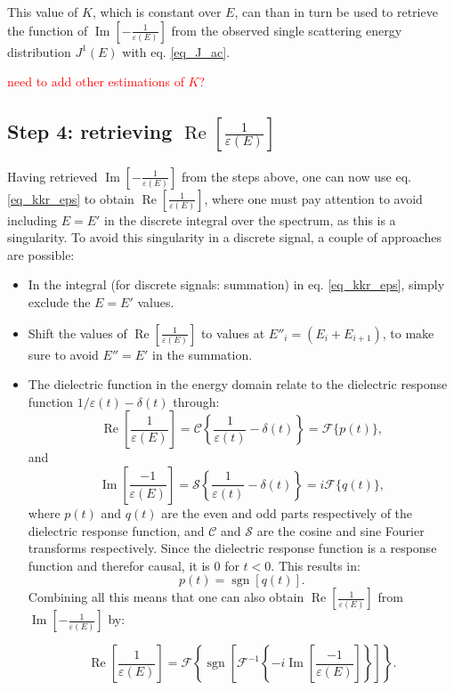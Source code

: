 \documentclass{article}
\begin{document}
This value of $K$, which is constant over $E$, can than in turn be used to retrieve the function of $\operatorname{Im}\left[-\frac{1}{\varepsilon(E)}\right]$ from the observed single scattering energy distribution $J^1(E)$ with eq. \eqref{eq_J_ac}.

\textcolor{red}{need to add other estimations of $K$?}

\subsection{Step 4: retrieving $\operatorname{Re}\left[\frac{1}{\varepsilon(E)}\right]$ }
Having retrieved $\operatorname{Im}\left[-\frac{1}{\varepsilon(E)}\right]$ from the steps above, one can now use eq. \eqref{eq_kkr_eps} to obtain $\operatorname{Re}\left[\frac{1}{\varepsilon(E)}\right]$, where one must pay attention to avoid including $E=E'$ in the discrete integral over the spectrum, as this is a singularity. To avoid this singularity in a discrete signal, a couple of approaches are possible:
\begin{itemize}
    \item In the integral (for discrete signals: summation) in eq. \eqref{eq_kkr_eps}, simply exclude the $E = E'$ values.
    \item Shift the values of $\operatorname{Re}\left[\frac{1}{\varepsilon(E)}\right]$ to values at $E''_i = (E_i + E_{i+1})$, to make sure to avoid $E'' = E'$ in the summation.
    \item  The dielectric function in the energy domain relate to the dielectric response function $1/\varepsilon(t) -\delta(t)$ through:
    \begin{equation}
        \operatorname{Re}\left[\frac{1}{\varepsilon(E)}\right] = \mathcal{C}\left\{\frac{1}{\varepsilon(t)} - \delta(t)\right\} = \mathcal{F}\{p(t)\},
    \end{equation}
    and 
    \begin{equation}
        \operatorname{Im}\left[\frac{-1}{\varepsilon(E)}\right] = \mathcal{S}\left\{\frac{1}{\varepsilon(t)} - \delta(t)\right\} = i\mathcal{F}\{q(t)\},
    \end{equation}
    where $p(t)$ and $q(t)$ are the even and odd parts respectively of the dielectric response function, and $\mathcal{C}$ and $\mathcal{S}$ are the cosine and sine Fourier transforms respectively. Since the dielectric response function is a response function and therefor causal, it is $0$ for $t<0$. This results in:
    \begin{equation}
        p(t) = \operatorname{sgn}[q(t)].
    \end{equation}
    Combining all this means that one can also obtain $\operatorname{Re}\left[\frac{1}{\varepsilon(E)}\right]$ from $\operatorname{Im}\left[-\frac{1}{\varepsilon(E)}\right]$ by:
    
    \begin{equation}
        \operatorname{Re}\left[\frac{1}{\varepsilon(E)}\right] =\mathcal{F}\left\{\operatorname{sgn}\left[\mathcal{F}^{-1}\left\{-i \operatorname{Im}\left[\frac{-1}{ \varepsilon(E)}\right]\right\}\right]\right\}.
    \end{equation}
\end{itemize}
\end{document}
